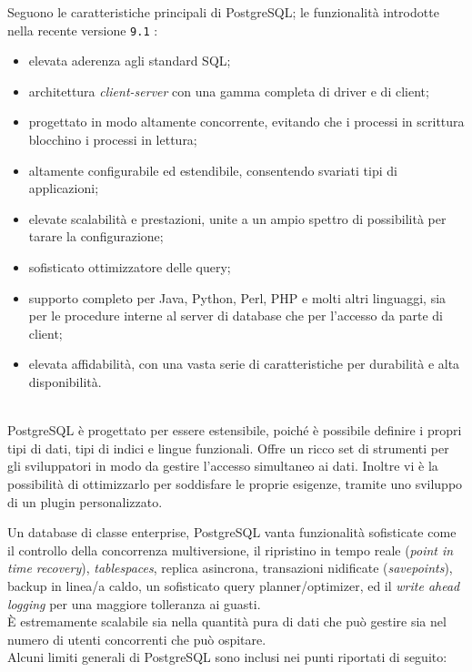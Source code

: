 Seguono le caratteristiche principali di PostgreSQL; le funzionalit\`{a} introdotte nella recente versione \verb"9.1" :
\begin{itemize}
\item 
elevata aderenza agli standard SQL;
\item 
architettura\textit{ client-server} con una gamma completa di driver e di client;
\item 
progettato in modo altamente concorrente, evitando che i processi in scrittura blocchino i processi in lettura;
\item 
altamente configurabile ed estendibile, consentendo svariati tipi di applicazioni;
\item 
elevate scalabilit\`{a} e prestazioni, unite a un ampio spettro di possibilit\`{a} per tarare la configurazione;
\item 
sofisticato ottimizzatore delle query;
\item 
supporto completo per Java, Python, Perl, PHP e molti altri linguaggi, sia per le procedure interne al server di database che per l'accesso da parte di client;
\item 
elevata affidabilit\`{a}, con una vasta serie di caratteristiche per durabilit\`{a} e alta disponibilit\`{a}\cite{etichetta12}.
\end{itemize}\\

PostgreSQL \`{e} progettato per essere estensibile, poich\'{e} \`{e} possibile definire i propri tipi di dati, tipi di indici e lingue funzionali. Offre un ricco set di strumenti per gli sviluppatori in modo da gestire l'accesso simultaneo ai dati. Inoltre vi \`{e} la possibilit\`{a} di ottimizzarlo per soddisfare le proprie esigenze, tramite uno sviluppo di un plugin personalizzato.

Un database di classe enterprise, PostgreSQL vanta funzionalit\`{a} sofisticate come il controllo della concorrenza multiversione, il ripristino in tempo reale (\textit{point in time recovery}), \textit{tablespaces}, replica asincrona, transazioni nidificate (\textit{savepoints}), backup in linea/a caldo, un sofisticato query planner/optimizer, ed il \textit{write ahead logging} per una maggiore tolleranza ai guasti.\\
\`{E} estremamente scalabile sia nella quantit\`{a} pura di dati che pu\`{o} gestire sia nel numero di utenti concorrenti che pu\`{o} ospitare\cite{etichetta15}.\\

Alcuni limiti generali di PostgreSQL sono inclusi nei punti riportati di seguito:\\

